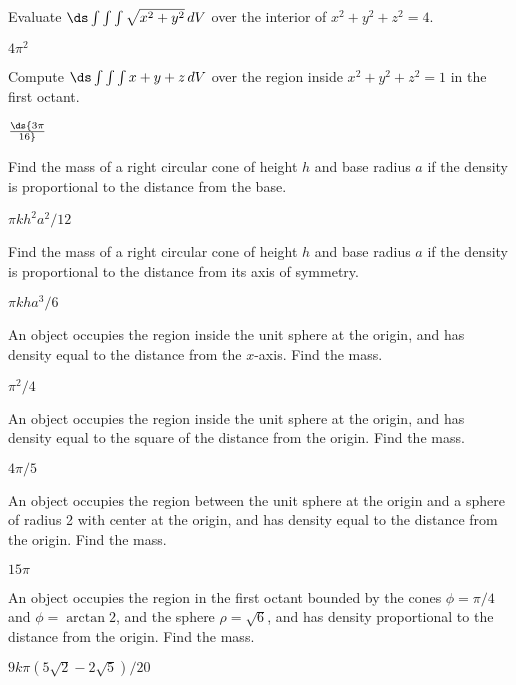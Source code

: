 \begin{enumialphparenastyle}
\begin{ex}
Evaluate $\ds\int\int\int \sqrt{x^2+y^2}\,dV$
over the interior of $x^2+y^2+z^2=4$.
\begin{sol}
$4\pi^2$
\end{sol}
\end{ex}

\begin{ex}
Compute $\ds\int\int\int
x+y+z\,dV$ over the region inside
$x^2+y^2+z^2 = 1$ in the first octant.
\begin{sol}
$\ds {3\pi\over16}$
\end{sol}
\end{ex}

\begin{ex}
Find the mass of a right circular cone of height $h$ and
base radius $a$ if the density is proportional to the distance from
the base.
\begin{sol}
$\pi kh^2a^2/12$
\end{sol}
\end{ex}

\begin{ex}
Find the mass of a right circular cone of height $h$ and
base radius $a$ if the density is proportional to the distance from
its axis of symmetry.
\begin{sol}
$\pi kha^3/6$
\end{sol}
\end{ex}

\begin{ex}
An object occupies the region inside the unit sphere at the
origin, and has density equal to the distance from the $x$-axis. Find
the mass.
\begin{sol}
$\pi^2/4$
\end{sol}
\end{ex}

\begin{ex}
An object occupies the region inside the unit sphere at the
origin, and has density equal to the square of the distance from the
origin. Find the mass.
\begin{sol}
$4\pi/5$
\end{sol}
\end{ex}

\begin{ex}
An object occupies the region between the unit sphere at the
origin and a sphere of radius 2 with center at the origin, and has
density equal to the distance from the origin. Find the mass.
\begin{sol}
$15\pi$
\end{sol}
\end{ex}

\begin{ex}
An object occupies the region in the first octant bounded by
the cones $\phi = \pi/4$ and $\phi = \arctan 2$, and the sphere $\rho
= \sqrt{6}$, and has density proportional to the distance from the
origin. Find the mass.
\begin{sol}
$9k\pi(5\sqrt2-2\sqrt5)/20$
\end{sol}
\end{ex}

\end{enumialphparenastyle}